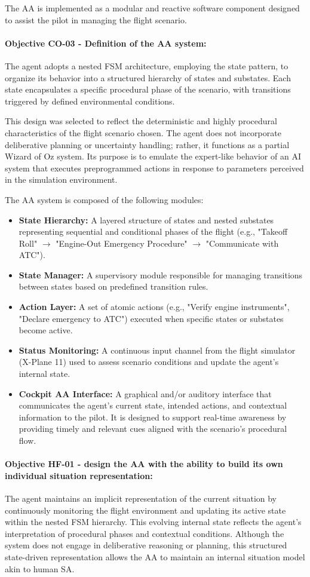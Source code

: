 \documentclass[12pt,a4paper]{article} %
\begin{document}
	The AA is implemented as a modular and reactive software component designed to assist the pilot in managing the flight scenario.
	\paragraph{Objective CO-03 - Definition of the AA system:} The agent adopts a nested FSM architecture, employing the state pattern, to organize its behavior into a structured hierarchy of states and substates. Each state encapsulates a specific procedural phase of the scenario, with transitions triggered by defined environmental conditions.
	
	This design was selected to reflect the deterministic and highly procedural characteristics of the flight scenario chosen. The agent does not incorporate deliberative planning or uncertainty handling; rather, it functions as a partial Wizard of Oz system. Its purpose is to emulate the expert-like behavior of an AI system that executes preprogrammed actions in response to parameters perceived in the simulation environment.
	
	The AA system is composed of the following modules: 
	\begin{itemize} 
		\item \textbf{State Hierarchy:} A layered structure of states and nested substates representing sequential and conditional phases of the flight (e.g., "Takeoff Roll" $\rightarrow$ "Engine-Out Emergency Procedure" $\rightarrow$ "Communicate with ATC").
		\item \textbf{State Manager:} A supervisory module responsible for managing transitions between states based on predefined transition rules.
		\item \textbf{Action Layer:} A set of atomic actions (e.g., "Verify engine instruments", "Declare emergency to ATC") executed when specific states or substates become active.
		\item \textbf{Status Monitoring:} A continuous input channel from the flight simulator (X-Plane 11) used to assess scenario conditions and update the agent's internal state. 
		\item \textbf{Cockpit AA Interface:} A graphical and/or auditory interface that communicates the agent's current state, intended actions, and contextual information to the pilot. It is designed to support real-time awareness by providing timely and relevant cues aligned with the scenario's procedural flow.
	\end{itemize}
	\paragraph{Objective HF-01 - design the AA with the ability to build its own individual situation representation:}
	The agent maintains an implicit representation of the current situation by continuously monitoring the flight environment and updating its active state within the nested FSM hierarchy. This evolving internal state reflects the agent's interpretation of procedural phases and contextual conditions. Although the system does not engage in deliberative reasoning or planning, this structured state-driven representation allows the AA to maintain an internal situation model akin to human SA.
\end{document}
